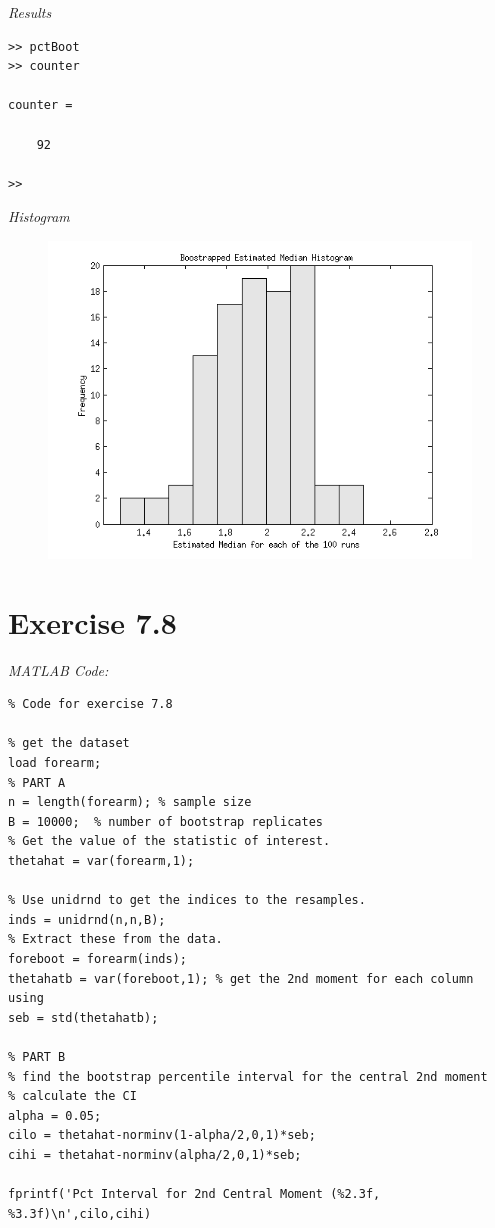 \documentclass[12pt,a4paper]{article}
\begin{document}
\begin{enumerate}[a)]
{\textit{Results}\\
\begin{verbatim}
>> pctBoot
>> counter

counter =

    92

>> 
\end{verbatim}

\textit{Histogram}

\begin{figure}[ht!] 
\begin{center}
\includegraphics[scale=.7]{inClass_pct_hist.png}
\caption{}
\label{inclass6 fig3}
\end{center}
\end{figure}
\FloatBarrier


}
\end{enumerate}

\clearpage

\section*{Exercise 7.8}
\textit{MATLAB Code:}\\

\begin{verbatim}
% Code for exercise 7.8

% get the dataset
load forearm;
% PART A
n = length(forearm); % sample size
B = 10000;	% number of bootstrap replicates
% Get the value of the statistic of interest.
thetahat = var(forearm,1);

% Use unidrnd to get the indices to the resamples.
inds = unidrnd(n,n,B);
% Extract these from the data.
foreboot = forearm(inds);
thetahatb = var(foreboot,1); % get the 2nd moment for each column using
seb = std(thetahatb);

% PART B
% find the bootstrap percentile interval for the central 2nd moment
% calculate the CI
alpha = 0.05;
cilo = thetahat-norminv(1-alpha/2,0,1)*seb;
cihi = thetahat-norminv(alpha/2,0,1)*seb;

fprintf('Pct Interval for 2nd Central Moment (%2.3f, %3.3f)\n',cilo,cihi)
\end{verbatim}
\end{document}
